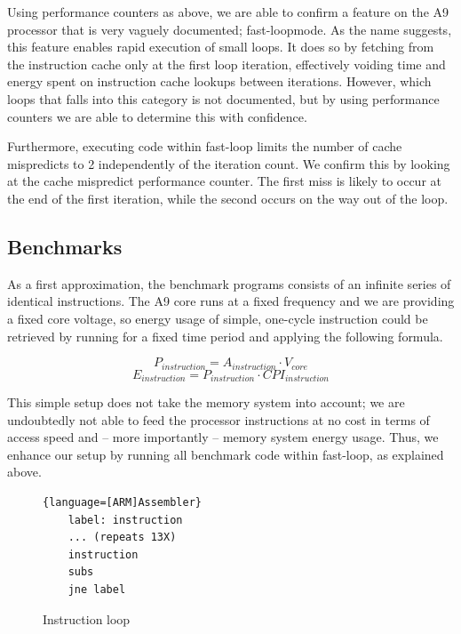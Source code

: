 Using performance counters as above, we are able to confirm a feature on the A9
processor that is very vaguely documented; fast-loop\texttrademark mode. As the
name suggests, this feature enables rapid execution of small loops. It does so
by fetching from the instruction cache only at the first loop iteration,
effectively voiding time and energy spent on instruction cache lookups between
iterations. However, which loops that falls into this category is not
documented, but by using performance counters we are able to determine this with
confidence.

Furthermore, executing code within fast-loop limits the number of cache
mispredicts to 2 independently of the iteration count. We confirm this by
looking at the cache mispredict  performance counter. The
first miss is likely to occur at the end of the first iteration, while the
second occurs on the way out of the loop.

\subsection{Benchmarks}
As a first approximation, the benchmark programs consists of an infinite series
of identical instructions. The A9 core runs at a fixed frequency and we are
providing a fixed core voltage, so energy usage of simple, one-cycle instruction
could be retrieved by running for a fixed time period and applying the following
formula.

\begin{equation}
    P_{instruction} = A_{instruction} \cdot V_{core}
\end{equation}
\begin{equation}
    E_{instruction} = P_{instruction} \cdot CPI_{instruction}
\end{equation}


This simple setup does not take the memory system into account; we are
undoubtedly not able to feed the processor instructions at no cost in terms of
access speed and -- more importantly -- memory system energy usage. Thus, we
enhance our setup by running all benchmark code within fast-loop, as explained
above.


\begin{figure}
    \begin{lstlisting}{language=[ARM]Assembler}
    label: instruction
    ... (repeats 13X)
    instruction
    subs
    jne label
    \end{lstlisting}
    \caption{Instruction loop}
    \label{list:inst_loop}
\end{figure}

